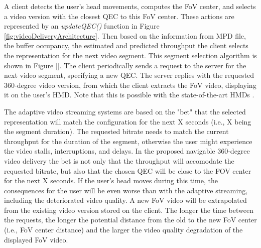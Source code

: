 


A client detects the user's head movements, computes the FoV center, and selects a video version with the closest QEC to this FoV center. These actions are represented by an \textit{updateQEC()} function in Figure \ref{fig:videoDeliveryArchitecture}.  Then based on the information from MPD file, the buffer occupancy, the estimated and predicted throughput the client selects the representation for the next video segment. This segment selection algorithm is shown in Figure \ref{}. The client periodically sends a request to the server for the next video segment, specifying a new QEC. The server replies with the requested 360-degree video version, from which the client extracts the FoV video, displaying it on the user's HMD. Note that this is possible with the state-of-the-art HMDs \cite{}.

The adaptive video streaming systems are based on the "bet" that the selected representation will match the configuration for the next X seconds (i.e., X being the segment duration). The requested bitrate needs to match the current throughput for the duration of the segment, otherwise the user might experience the video stalls, interruptions, and delays. In the proposed navigable 360-degree video delivery the bet is not only that the throughput will accomodate the requested bitrate, but also that the chosen QEC will be close to the FOV center for the next X seconds. If the user's head moves during this time, the consequences for the user will be even worse than with the adaptive streaming, including the deteriorated video quality. A new FoV video will be extrapolated from the existing video version stored on the client. The longer the time between the requests, the longer the potential distance from the old to the new FoV center (i.e., FoV center distance) and the larger the video quality degradation of the displayed FoV video.

